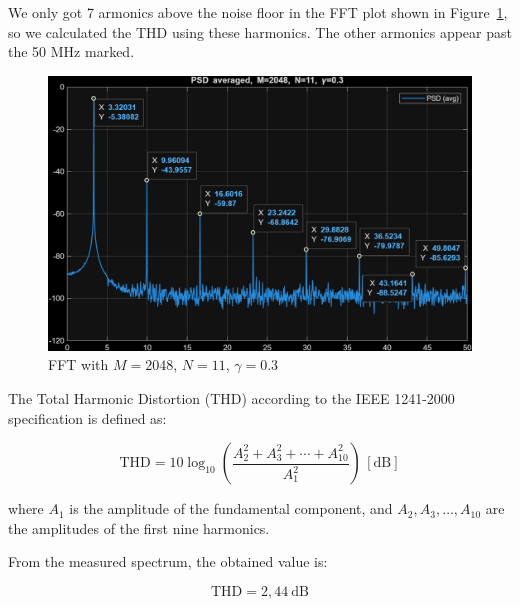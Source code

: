 We only got 7 armonics above the noise floor in the FFT plot shown in Figure~\ref{fig:task5_thd}, so we calculated the THD using these harmonics.
The other armonics appear past the 50 MHz marked.

\begin{figure}[H]
    \centering
    \includegraphics[width=1\textwidth]{img/task5_thd.png}
    \caption{FFT with $M=2048$, $N=11$, $\gamma=0.3$}
    \label{fig:task5_thd}
\end{figure}

The Total Harmonic Distortion (THD) according to the IEEE 1241-2000 specification is defined as:

\[
\mathrm{THD} = 10 \log_{10}
\left(
    \frac{A_2^2 + A_3^2 + \cdots + A_{10}^2}{A_1^2}
\right) \, \mathrm{[dB]}
\]

where \(A_1\) is the amplitude of the fundamental component, and \(A_2, A_3, \ldots, A_{10}\) are the amplitudes of the first nine harmonics.

From the measured spectrum, the obtained value is:

\[
\mathrm{THD} = 2,44~\mathrm{dB}
\]
